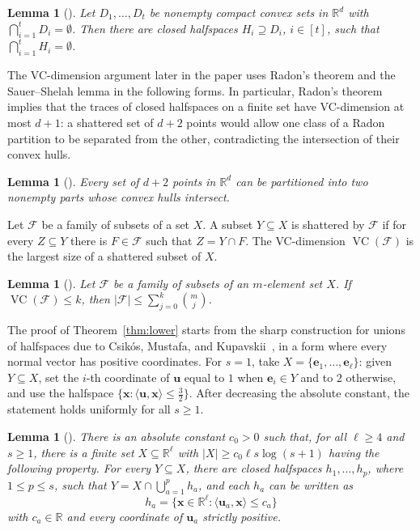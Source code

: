 \documentclass[11pt]{article}
\newtheorem{lemma}[theorem]{Lemma}
\theoremstyle{definition}
\newcommand*{\abs}[1]{\lvert#1\rvert}
\newcommand{\R}{\mathbb{R}}
\newcommand{\VC}{\operatorname{VC}}
\begin{document}
\begin{lemma}[\cite{GaleKlee1959}]\label{lem:separation}
Let \(D_{1},\ldots,D_{t}\) be nonempty compact convex sets in \(\R^{d}\) with \(\bigcap_{i=1}^{t}D_{i}=\emptyset\). Then there are closed halfspaces \(H_{i}\supseteq D_{i}\), \(i\in [t]\), such that \(\bigcap_{i=1}^{t}H_{i}=\emptyset\).
\end{lemma}


The VC-dimension argument later in the paper uses Radon's theorem and the Sauer--Shelah lemma in the following forms. In particular, Radon's theorem implies that the traces of closed halfspaces on a finite set have VC-dimension at most \(d+1\): a shattered set of \(d+2\) points would allow one class of a Radon partition to be separated from the other, contradicting the intersection of their convex hulls.

\begin{lemma}[\cite{Radon1921}]\label{lem:radon}
Every set of \(d+2\) points in \(\R^{d}\) can be partitioned into two nonempty parts whose convex hulls intersect.
\end{lemma}

Let \(\mathcal{F}\) be a family of subsets of a set \(X\). A subset \(Y\subseteq X\) is shattered by \(\mathcal{F}\) if for every \(Z\subseteq Y\) there is \(F\in\mathcal{F}\) such that \(Z=Y\cap F\). The VC-dimension \(\VC(\mathcal{F})\) is the largest size of a shattered subset of \(X\).

\begin{lemma}[\cite{Sauer1972,Shelah1972,1971TPAVCVC}]\label{lem:sauer}
Let \(\mathcal{F}\) be a family of subsets of an \(m\)-element set \(X\). If \(\VC(\mathcal{F})\le k\), then \(\abs{\mathcal{F}}\le\sum_{j=0}^{k}\binom{m}{j}\).
\end{lemma}

The proof of Theorem~\ref{thm:lower} starts from the sharp construction for unions of halfspaces due to Csik\'{o}s, Mustafa, and Kupavskii~\cite{2019JMLR}, in a form where every normal vector has positive coordinates. For \(s=1\), take \(X=\{\boldsymbol{e}_{1},\ldots,\boldsymbol{e}_{\ell}\}\): given \(Y\subseteq X\), set the \(i\)-th coordinate of \(\boldsymbol{u}\) equal to \(1\) when \(\boldsymbol{e}_{i}\in Y\) and to \(2\) otherwise, and use the halfspace \(\{\boldsymbol{x}:\langle\boldsymbol{u},\boldsymbol{x}\rangle\le\frac{3}{2}\}\). After decreasing the absolute constant, the statement holds uniformly for all \(s\ge1\).

\begin{lemma}[\cite{2019JMLR}]\label{lem:polytope-vc}
There is an absolute constant \(c_{0}>0\) such that, for all \(\ell\ge4\) and \(s\ge1\), there is a finite set \(X\subseteq\R^{\ell}\) with \(\abs{X}\ge c_{0}\ell s\log(s+1)\) having the following property. For every \(Y\subseteq X\), there are closed halfspaces \(h_{1},\ldots,h_{p}\), where \(1\le p\le s\), such that \(Y=X\cap\bigcup_{a=1}^{p}h_{a}\), and each \(h_{a}\) can be written as
\[
h_{a}=\{\boldsymbol{x}\in\R^{\ell}:\langle\boldsymbol{u}_{a},\boldsymbol{x}\rangle\le c_{a}\}
\]
with \(c_{a}\in\R\) and every coordinate of \(\boldsymbol{u}_{a}\) strictly positive.
\end{lemma}
\end{document}
